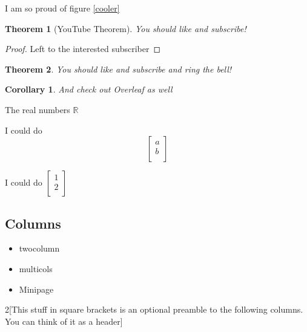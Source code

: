 \documentclass{report}
\newtheorem{theorem}{Theorem}[section]
\newtheorem{corollary}{Corollary}[theorem]
\newcommand{\R}{\mathbb{R}}
\newcommand{\cv}[2]{\begin{bmatrix}
        #1 \\
        #2 \\
    \end{bmatrix}}
\begin{document}
I am so proud of figure \ref{cooler}

\newpage

\begin{theorem}[YouTube Theorem]
    You should like and subscribe!
\end{theorem}
\begin{proof}
    Left to the interested subscriber
\end{proof}

\begin{theorem}
    You should like and subscribe and ring the bell!
\end{theorem}

\begin{corollary}
    And check out Overleaf as well
\end{corollary}

The real numbers $\R$

I could do \[\begin{bmatrix}
        a \\
        b \\
    \end{bmatrix}\]

I could do $\cv{1}{2}$

\subsection{Columns}
\begin{itemize}
    \item twocolumn
    \item multicols
    \item Minipage
\end{itemize}

\lipsum[1-5]

\newpage
\begin{multicols*}{2}[This stuff in square brackets is an optional preamble to the following columns. You can think of it as a header]
    \lipsum[1-5]
\end{multicols*}
\end{document}
